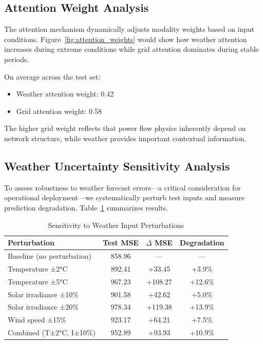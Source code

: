 \documentclass[journal,12pt,onecolumn]{IEEEtran}
\begin{document}
\subsection{Attention Weight Analysis}

The attention mechanism dynamically adjusts modality weights based on input conditions. Figure~\ref{fig:attention_weights} would show how weather attention increases during extreme conditions while grid attention dominates during stable periods.

On average across the test set:
\begin{itemize}
    \item Weather attention weight: 0.42
    \item Grid attention weight: 0.58
\end{itemize}

The higher grid weight reflects that power flow physics inherently depend on network structure, while weather provides important contextual information.

\subsection{Weather Uncertainty Sensitivity Analysis}

To assess robustness to weather forecast errors—a critical consideration for operational deployment—we systematically perturb test inputs and measure prediction degradation. Table~\ref{tab:sensitivity} summarizes results.

\begin{table}[htbp]
\caption{Sensitivity to Weather Input Perturbations}
\label{tab:sensitivity}
\centering
\begin{tabular}{lccc}
\toprule
\textbf{Perturbation} & \textbf{Test MSE} & \textbf{$\Delta$ MSE} & \textbf{Degradation} \\
\midrule
Baseline (no perturbation) & 858.96 & --- & --- \\
Temperature ±2°C & 892.41 & +33.45 & +3.9\% \\
Temperature ±5°C & 967.23 & +108.27 & +12.6\% \\
Solar irradiance ±10\% & 901.58 & +42.62 & +5.0\% \\
Solar irradiance ±20\% & 978.34 & +119.38 & +13.9\% \\
Wind speed ±15\% & 923.17 & +64.21 & +7.5\% \\
Combined (T±2°C, I±10\%) & 952.89 & +93.93 & +10.9\% \\
\bottomrule
\end{tabular}
\end{table}
\end{document}
